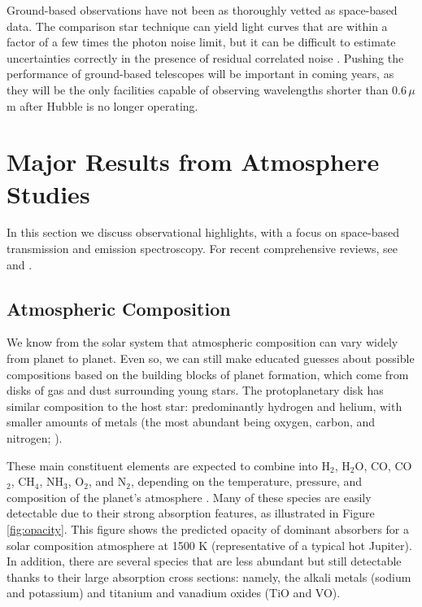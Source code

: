 \documentclass[graybox,natbib,nosecnum]{svmult}
\begin{document}
Ground-based observations have not been as thoroughly vetted as space-based data.  The comparison star technique can yield light curves that are within a factor of a few times the photon noise limit, but it can be difficult to estimate uncertainties correctly in the presence of residual correlated noise \citep[e.g.][]{jordan13, beatty16}.  Pushing the performance of ground-based telescopes will be important in coming years, as they will be the only facilities capable of observing wavelengths shorter than $0.6\,\mu$m after Hubble is no longer operating. 

\section{Major Results from Atmosphere Studies}
In this section we discuss observational highlights, with a focus on space-based transmission and emission spectroscopy.  For recent comprehensive reviews, see \cite{crossfield15} and \cite{deming17}. 

\subsection{Atmospheric Composition}
We know from the solar system that atmospheric composition can vary widely from planet to planet. Even so, we can still make educated guesses about possible compositions based on the building blocks of planet formation,  which come from disks of gas and dust surrounding young stars.  The protoplanetary disk has similar composition to the host star: predominantly hydrogen and helium, with smaller amounts of metals (the most abundant being oxygen, carbon, and nitrogen; \citealt{anders89}).  %

These main constituent elements are expected to combine into H$_2$, H$_2$O, CO, CO$_2$, CH$_4$, NH$_3$, O$_2$, and N$_2$, depending on the temperature, pressure, and composition of the planet's atmosphere \citep{moses13}.  Many of these species are easily detectable due to their strong absorption features, as illustrated in Figure\,\ref{fig:opacity}.  This figure shows the predicted opacity of dominant absorbers for a solar composition atmosphere at 1500 K (representative of a typical hot Jupiter).  In addition, there are several species that are less abundant but still detectable thanks to their large absorption cross sections: namely, the alkali metals (sodium and potassium) and titanium and vanadium oxides (TiO and VO). 
\end{document}
